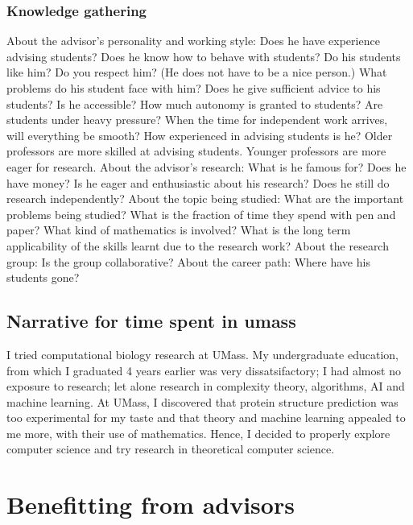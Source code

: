 \documentclass[oneside, article]{memoir}
\begin{document}
\subsection{Knowledge gathering}
\subitem About the advisor's personality and working style:
\subsubitem Does he have experience advising students? Does he know how to behave with students?
\subsubitem Do his students like him? Do you respect him? (He does not have to be a nice person.)
\subsubitem What problems do his student face with him?
\subsubitem Does he give sufficient advice to his students? Is he accessible?
\subsubitem How much autonomy is granted to students? Are students under heavy pressure?
\subsubitem When the time for independent work arrives, \\will everything be smooth?
\subsubitem How experienced in advising students is he?
Older professors are more skilled at advising students. Younger professors are more eager for research.
\subitem About the advisor's research:
\subsubitem What is he famous for?
\subsubitem Does he have money?
\subsubitem Is he eager and enthusiastic about his research?
\subsubitem Does he still do research independently?
\subitem About the topic being studied:
\subsubitem What are the important problems being studied?
\subsubitem What is the fraction of time they spend with pen and paper?
\subsubitem What kind of mathematics is involved?
\subsubitem What is the long term applicability of the skills learnt due to the research work?
\subitem About the research group:
\subsubitem Is the group collaborative?
\subitem About the career path:
\subsubitem Where have his students gone?

\section{Narrative for time spent in umass}
I tried computational biology research at UMass. My undergraduate education, from which I graduated 4 years earlier was very dissatsifactory; I had almost no exposure to research; let alone research in complexity theory, algorithms, AI and machine learning. At UMass, I discovered that protein structure prediction was too experimental for my taste and that theory and machine learning appealed to me more, with their use of mathematics. Hence, I decided to properly explore computer science and try research in theoretical computer science.

\chapter{Benefitting from advisors}
\end{document}
